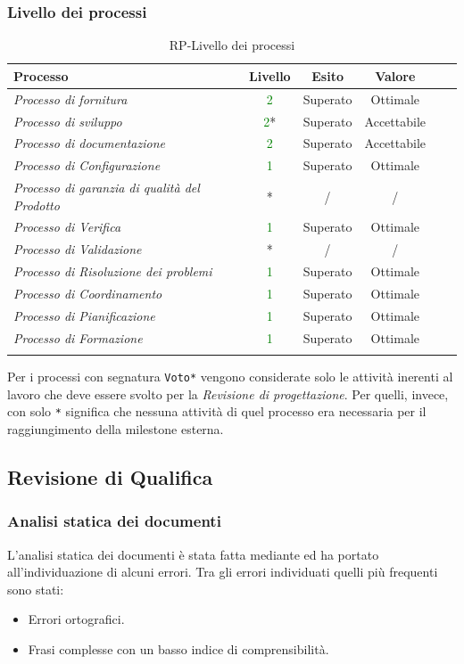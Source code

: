 \subsubsection{Livello dei processi}
\begin{longtable}{|>{\centering}m{6cm}|c|c|c|c|c|}
\hline
\textbf{Processo} & \textbf{Livello} & \textbf{Esito} & \textbf{Valore}\\
\hline
\endhead
\emph{Processo di fornitura} & \textcolor{Green}{2} & Superato & Ottimale\\ \hline
\emph{Processo di sviluppo} & \textcolor{Green}{2}* & Superato & Accettabile\\ \hline
\emph{Processo di documentazione} & \textcolor{Green}{2} & Superato & Accettabile\\ 
\hline
\emph{Processo di Configurazione} & \textcolor{Green}{1} & Superato & Ottimale\\ 
\hline
\emph{Processo di garanzia di qualità del Prodotto} & * & / & /\\ 
\hline
\emph{Processo di Verifica} & \textcolor{Green}{1} & Superato & Ottimale\\ 
\hline
\emph{Processo di Validazione} & * & / & /\\ 
\hline
\emph{Processo di Risoluzione dei problemi} & \textcolor{Green}{1} & Superato & Ottimale\\ 
\hline
\emph{Processo di Coordinamento} & \textcolor{Green}{1} & Superato & Ottimale\\ 
\hline
\emph{Processo di Pianificazione} & \textcolor{Green}{1} & Superato & Ottimale\\ 
\hline
\emph{Processo di Formazione} & \textcolor{Green}{1} & Superato & Ottimale\\ 
\hline
\caption{RP-Livello dei processi}
\end{longtable}

Per i processi con segnatura \texttt{Voto*} vengono considerate solo le attività inerenti al lavoro che deve essere svolto per la \textit{Revisione di progettazione}. Per quelli, invece, con solo \texttt{*} significa che nessuna attività di quel processo era necessaria per il raggiungimento della milestone esterna.

\newpage

\subsection{Revisione di Qualifica}

\subsubsection{Analisi statica dei documenti}
L'analisi statica dei documenti è stata fatta mediante  ed ha portato all'individuazione di alcuni errori. Tra gli errori individuati quelli più frequenti sono stati:
		\begin{itemize}
			\item Errori ortografici.
			\item Frasi complesse con un basso indice di comprensibilità.
		\end{itemize}

